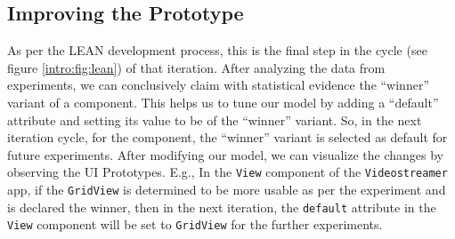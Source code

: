 \subsection{Improving the Prototype}
\label{solutionideas:subsection:improvingprototypes}
As per the LEAN development process, this is the final step in the cycle (see figure \ref{intro:fig:lean}) of that iteration.
After analyzing the data from experiments, we can conclusively claim with statistical evidence the ``winner'' variant of a component.
This helps us to tune our model by adding a ``default'' attribute and setting its value to be of the ``winner'' variant.
So, in the next iteration cycle, for the component, the ``winner'' variant is selected as default for future experiments.
After modifying our model, we can visualize the changes by observing the UI Prototypes.
E.g., In the \texttt{View} component of the \texttt{Videostreamer} app, if the \texttt{GridView} is determined to be more usable as per the experiment and is declared the winner, then in the next iteration, the \texttt{default} attribute in the \texttt{View} component will be set to \texttt{GridView} for the further experiments.